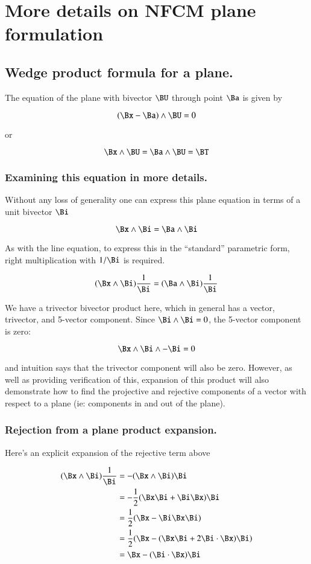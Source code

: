 \chapter{More details on NFCM plane formulation} 

\section{Wedge product formula for a plane.}

The equation of the plane with bivector $\BU$ through point $\Ba$ is given
by

\[
(\Bx - \Ba) \wedge \BU = 0
\]

or

\[
\Bx \wedge \BU = \Ba \wedge \BU = \BT
\]

\subsection{Examining this equation in more details. }

Without any loss of generality one can express this plane equation
in terms of a unit bivector $\Bi$

\[
\Bx \wedge \Bi = \Ba \wedge \Bi
\]

As with the line equation, to express this in the ``standard'' parametric
form, right multiplication with $1/\Bi$ is required.

\[
(\Bx \wedge \Bi)\frac{1}{\Bi} = (\Ba \wedge \Bi)\frac{1}{\Bi}
\]

We have a trivector bivector product here, which in general has a vector,
trivector, and 5-vector component.  Since $\Bi \wedge \Bi = 0$, the
5-vector component is zero:

\[
\Bx \wedge \Bi \wedge -\Bi = 0
\]

and intuition says that the trivector component will also be zero.  However,
as well as providing verification of this, expansion of this product will also
demonstrate how to find the projective and rejective components of a vector
with respect to a plane (ie: components in and out of the plane).

\subsection{Rejection from a plane product expansion.}

Here's an explicit expansion of the rejective term above

\begin{align*}
(\Bx \wedge \Bi)\frac{1}{\Bi} 
&= -(\Bx \wedge \Bi){\Bi} \\ 
&= -\frac{1}{2}(\Bx\Bi + \Bi\Bx){\Bi} \\ 
&= \frac{1}{2}(\Bx - \Bi\Bx\Bi) \\ 
&= \frac{1}{2}(\Bx - (\Bx \Bi + 2 \Bi \cdot \Bx)\Bi) \\ 
&= \Bx - (\Bi \cdot \Bx)\Bi \\ 
\end{align*}

